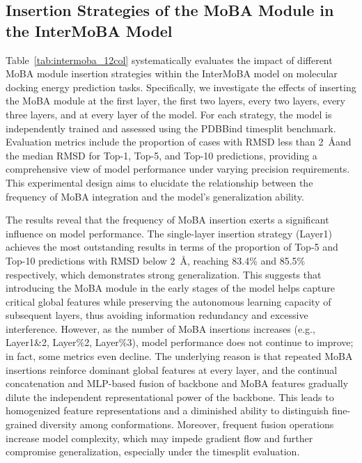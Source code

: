 \documentclass[lettersize,journal]{IEEEtran}
\begin{document}
\subsection{Insertion Strategies of the MoBA Module in the InterMoBA Model}
Table~\ref{tab:intermoba_12col} systematically evaluates the impact of different MoBA module insertion strategies within the InterMoBA model on molecular docking energy prediction tasks. Specifically, we investigate the effects of inserting the MoBA module at the first layer, the first two layers, every two layers, every three layers, and at every layer of the model. For each strategy, the model is independently trained and assessed using the PDBBind timesplit benchmark. Evaluation metrics include the proportion of cases with RMSD less than 2~\AA and the median RMSD for Top-1, Top-5, and Top-10 predictions, providing a comprehensive view of model performance under varying precision requirements. This experimental design aims to elucidate the relationship between the frequency of MoBA integration and the model's generalization ability.

The results reveal that the frequency of MoBA insertion exerts a significant influence on model performance. The single-layer insertion strategy (Layer1) achieves the most outstanding results in terms of the proportion of Top-5 and Top-10 predictions with RMSD below 2~\AA, reaching 83.4\% and 85.5\% respectively, which demonstrates strong generalization. This suggests that introducing the MoBA module in the early stages of the model helps capture critical global features while preserving the autonomous learning capacity of subsequent layers, thus avoiding information redundancy and excessive interference. However, as the number of MoBA insertions increases (e.g., Layer1\&2, Layer\%2, Layer\%3), model performance does not continue to improve; in fact, some metrics even decline. The underlying reason is that repeated MoBA insertions reinforce dominant global features at every layer, and the continual concatenation and MLP-based fusion of backbone and MoBA features gradually dilute the independent representational power of the backbone. This leads to homogenized feature representations and a diminished ability to distinguish fine-grained diversity among conformations. Moreover, frequent fusion operations increase model complexity, which may impede gradient flow and further compromise generalization, especially under the timesplit evaluation.
\end{document}
